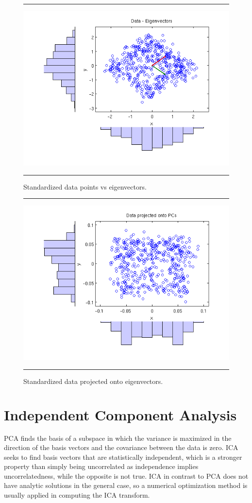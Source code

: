 \documentclass[11pt, oneside, a4paper]{report}
\begin{document}
\begin{figure}
  \centering
  \hrule
  \includegraphics[width = .9\textwidth]{Figures/pca_data_eigs}
  \hrule
  \caption{Standardized data points vs eigenvectors.}
\end{figure}

\begin{figure}
  \centering
  \hrule
  \includegraphics[width = .9\textwidth]{Figures/pca_eig_projection}
  \hrule
  \caption{Standardized data projected onto eigenvectors.}
\end{figure}

\chapter{Independent Component Analysis}\label{ica}


PCA finds the basis of a subspace in which the variance is
maximized in the direction of the basis vectors and the covariance
between the data is zero. ICA seeks to find basis
vectors that are statistically independent, which is a stronger
property than simply being uncorrelated as independence implies
uncorrelatedness, while the opposite is not true. 
ICA in contrast to PCA does not have analytic solutions in the general
case, so a numerical optimization method is usually applied in
computing the ICA transform.
\end{document}
